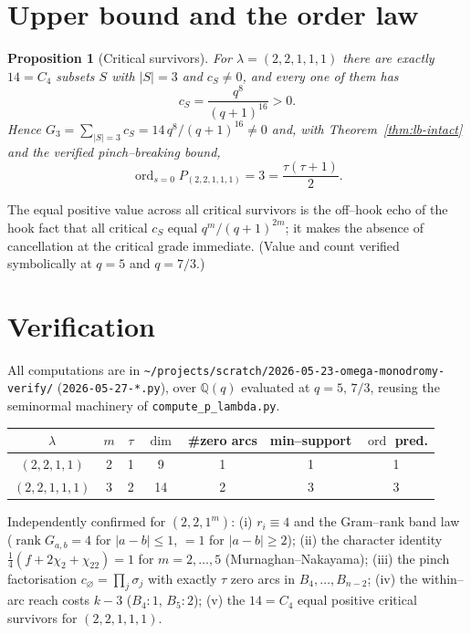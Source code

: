 \documentclass[11pt]{article}
\newtheorem{proposition}[theorem]{Proposition}
\theoremstyle{definition}
\DeclareMathOperator{\ord}{ord}
\DeclareMathOperator{\rank}{rank}
\newcommand{\la}{\lambda}
\begin{document}
\section{Upper bound and the order law}

\begin{proposition}[Critical survivors]\label{prop:surv}
For $\la=(2,2,1,1,1)$ there are exactly $14=C_4$ subsets $S$ with $|S|=3$ and $c_S\ne0$,
and every one of them has
\[
c_S=\frac{q^{8}}{(q+1)^{16}}>0 .
\]
Hence $G_3=\sum_{|S|=3}c_S=14\,q^8/(q+1)^{16}\ne0$ and, with
Theorem~\ref{thm:lb-intact} and the verified pinch--breaking bound,
\[
\ord_{s=0}P_{(2,2,1,1,1)}=3=\frac{\tau(\tau+1)}2 .
\]
\end{proposition}

\noindent The equal positive value across all critical survivors is the off--hook echo of
the hook fact that all critical $c_S$ equal $q^m/(q+1)^{2m}$; it makes the absence of
cancellation at the critical grade immediate. (Value and count verified symbolically at
$q=5$ and $q=7/3$.)

\section{Verification}

All computations are in
\texttt{\~{}/projects/scratch/2026-05-23-omega-monodromy-verify/}
(\texttt{2026-05-27-*.py}), over $\mathbb Q(q)$ evaluated at $q=5,\,7/3$, reusing the
seminormal machinery of \texttt{compute\_p\_lambda.py}.

\begin{center}
\begin{tabular}{c|c|c|c|c|c|c}
$\la$ & $m$ & $\tau$ & $\dim$ & \#zero arcs & min--support & $\ord$ pred.\\\hline
$(2,2,1,1)$   & 2 & 1 & 9  & 1 & 1 & 1\\
$(2,2,1,1,1)$ & 3 & 2 & 14 & 2 & 3 & 3\\
\end{tabular}
\end{center}

\noindent Independently confirmed for $(2,2,1^m)$: (i) $r_i\equiv4$ and the Gram--rank band
law ($\rank G_{a,b}=4$ for $|a-b|\le1$, $=1$ for $|a-b|\ge2$); (ii) the character identity
$\tfrac14(f+2\chi_2+\chi_{22})=1$ for $m=2,\dots,5$ (Murnaghan--Nakayama); (iii) the pinch
factorisation $c_\varnothing=\prod_j\sigma_j$ with exactly $\tau$ zero arcs in
$B_4,\dots,B_{n-2}$; (iv) the within--arc reach costs $k-3$ ($B_4{:}1$, $B_5{:}2$); (v) the
$14=C_4$ equal positive critical survivors for $(2,2,1,1,1)$.
\end{document}
